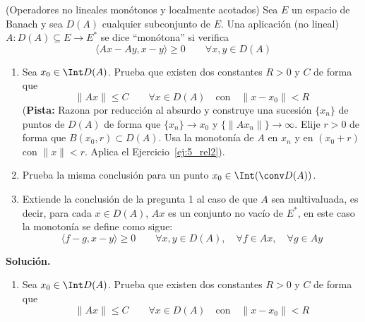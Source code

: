 \begin{ejercicio}\label{ej:6_rel2}
    (Operadores no lineales monótonos y localmente acotados)\newline
    Sea $E$ un espacio de Banach y sea $D(A)$ cualquier subconjunto de $E$. Una aplicación (no lineal) $A:D(A)\subseteq E\to E^\ast$ se dice ``monótona'' si verifica
    \begin{equation*}
        \langle Ax - Ay,x-y \rangle \geq 0 \qquad \forall x,y\in D(A)
    \end{equation*}
    \begin{enumerate}
        \item Sea $x_0\in \Int D(A)$. Prueba que existen dos constantes $R>0$ y $C$ de forma que
            \begin{equation*}
                \|Ax\|\leq C \qquad \forall x\in D(A) \quad \text{con}\quad \|x-x_0\|<R
            \end{equation*}
            (\textbf{Pista:} Razona por reducción al absurdo y construye una sucesión $\{x_n\}$ de puntos de $D(A)$ de forma que $\{x_n\}\to x_0$ y $\{\|Ax_n\|\}\to \infty$. Elije $r>0$ de forma que $B(x_0,r)\subset D(A)$. Usa la monotonía de $A$ en $x_n$ y en $(x_0+r)$ con $\|x\|<r$. Aplica el Ejercicio~\ref{ej:5_rel2}).
        \item Prueba la misma conclusión para un punto $x_0\in \Int(\conv D(A))$.
        \item Extiende la conclusión de la pregunta 1 al caso de que $A$ sea multivaluada, es decir, para cada $x\in D(A)$, $Ax$ es un conjunto no vacío de $E^\ast$, en este caso la monotonía se define como sigue:
            \begin{equation*}
                \langle f-g,x-y \rangle \geq 0 \qquad \forall x,y\in D(A), \quad \forall f\in Ax, \quad \forall g\in Ay
            \end{equation*}
    \end{enumerate}

    \noindent
    \textbf{Solución.}
    \begin{enumerate}
        \item Sea $x_0\in \Int D(A)$. Prueba que existen dos constantes $R>0$ y $C$ de forma que
            \begin{equation*}
                \|Ax\| \leq C \qquad \forall x\in D(A) \quad \text{con}\quad \|x-x_0\|<R
            \end{equation*}


\end{enumerate}
\end{ejercicio}
